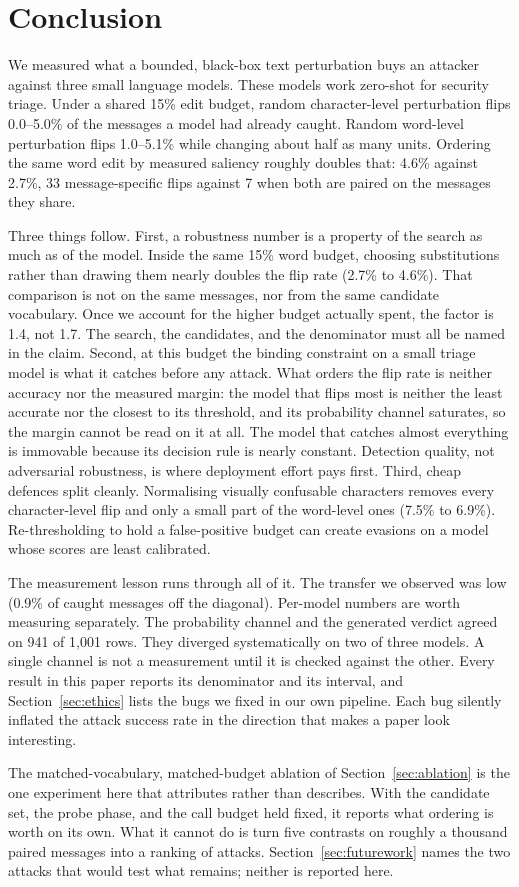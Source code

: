 \section{Conclusion}

We measured what a bounded, black-box text perturbation buys an attacker
against three small language models. These models work zero-shot for security
triage. Under a shared 15\% edit budget, random character-level perturbation
flips 0.0--5.0\% of the messages a model had already caught. Random
word-level perturbation flips 1.0--5.1\% while changing about half as many
units. Ordering the same word edit by measured saliency roughly doubles that:
4.6\% against 2.7\%, 33 message-specific flips against 7 when both are paired
on the messages they share.

Three things follow. First, a robustness number is a property of the search as
much as of the model. Inside the same 15\% word budget, choosing substitutions
rather than drawing them nearly doubles the flip rate (2.7\% to 4.6\%). That
comparison is not on the same messages, nor from the same candidate vocabulary. Once
we account for the higher budget actually spent, the factor is 1.4, not 1.7.
The search, the candidates, and the denominator must all be named in the claim.
Second, at this budget the binding constraint on a small triage model is what
it catches before any attack. What orders the flip rate is neither accuracy nor
the measured margin: the model that flips most is neither the least accurate nor
the closest to its threshold, and its probability channel saturates, so the
margin cannot be read on it at all. The model that catches almost everything is
immovable because its decision rule is nearly constant. Detection quality, not
adversarial robustness, is where deployment effort pays first. Third, cheap
defences split cleanly. Normalising visually confusable characters removes every
character-level flip and only a small part of the word-level ones (7.5\% to
6.9\%). Re-thresholding to hold a false-positive budget can create evasions on
a model whose scores are least calibrated.

The measurement lesson runs through all of it. The transfer we observed was low
(0.9\% of caught messages off the diagonal). Per-model numbers are worth
measuring separately. The probability channel and the generated verdict agreed
on 941 of 1{,}001 rows. They diverged systematically on two of three models.
A single channel is not a measurement until it is checked against the other.
Every result in this paper reports its denominator and its interval, and
Section~\ref{sec:ethics} lists the bugs we fixed in our own pipeline. Each bug silently inflated the attack success rate
in the direction that makes a paper look interesting.

The matched-vocabulary, matched-budget ablation of Section~\ref{sec:ablation} is the
one experiment here that attributes rather than describes. With the candidate
set, the probe phase, and the call budget held fixed, it reports what ordering
is worth on its own. What it cannot do is turn five contrasts on roughly a
thousand paired messages into a ranking of attacks. Section~\ref{sec:futurework}
names the two attacks that would test what remains; neither is reported here.
